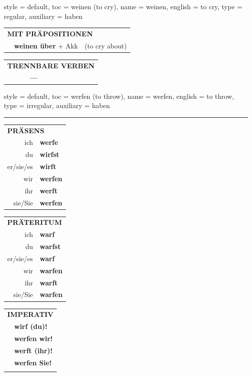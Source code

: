 \begin{verbentry}{
  style = {default},
  toc = {weinen (to cry)},
  name = {weinen},
  english = {to cry},
  type = {regular},
  auxiliary = {haben}
}
\vspace{10pt}

\begin{tabular}{lll}
\multicolumn{3}{l}{\textbf{MIT PRÄPOSITIONEN}}\\
& \textbf{weinen über} + Akk & (to cry about)\\
\end{tabular}
\hfill
\begin{tabular}{lll}
\multicolumn{3}{l}{\textbf{TRENNBARE VERBEN}}\\
& \textbf{---} & \\
\end{tabular}
\vspace{-5pt}
\end{verbentry}

\begin{verbentry}{
  style = {default},
  toc = {werfen (to throw)},
  name = {werfen},
  english = {to throw},
  type = {irregular},
  auxiliary = {haben}
}
 
    
     \vspace{5pt}

    \hrule
    
    \vspace{5pt}

  \begin{tabular}{rl}
     \multicolumn{2}{l}{\textbf{PRÄSENS} }\\
    ich & \textbf{werfe}\\
    du & \textbf{wirfst}\\
    er/sie/es & \textbf{wirft}\\
    wir & \textbf{werfen}\\
    ihr & \textbf{werft}\\
    sie/Sie & \textbf{werfen}\\
  \end{tabular}
  \hfill
     \begin{tabular}{rl}
    \multicolumn{2}{l}{\textbf{PRÄTERITUM} }\\
    ich & \textbf{warf}\\
    du & \textbf{warfst}\\
    er/sie/es & \textbf{warf}\\
    wir & \textbf{warfen}\\
    ihr & \textbf{warft}\\
    sie/Sie & \textbf{warfen}\\
  \end{tabular}
  \hfill
  \begin{tabular}{rl}
     \multicolumn{2}{l}{\textbf{IMPERATIV} }\\
   & \textbf{wirf (du)!}\\
   & \textbf{werfen wir!}\\
   & \textbf{werft (ihr)!}\\
   & \textbf{werfen Sie!}\\
   & \vspace{10pt}
  \end{tabular}


\end{verbentry}
